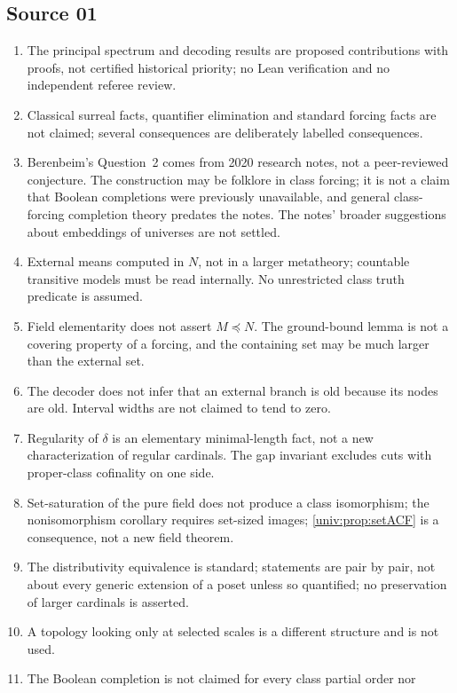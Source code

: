 \documentclass[11pt,letterpaper]{article}
\numberwithin{equation}{section}
\theoremstyle{definition}
\theoremstyle{remark}
\begin{document}
\subsection*{Source 01}
\begin{enumerate}[label=01.\arabic*,leftmargin=3.2em]
\item The principal spectrum and decoding results are proposed contributions
with proofs, not certified historical priority; no Lean verification and no
independent referee review.
\item Classical surreal facts, quantifier elimination and standard forcing facts
are not claimed; several consequences are deliberately labelled consequences.
\item Berenbeim's Question~2 comes from 2020 research notes, not a peer-reviewed
conjecture. The construction may be folklore in class forcing; it is not a
claim that Boolean completions were previously unavailable, and general
class-forcing completion theory predates the notes. The notes' broader
suggestions about embeddings of universes are not settled.
\item External means computed in $N$, not in a larger metatheory; countable
transitive models must be read internally. No unrestricted class truth
predicate is assumed.
\item Field elementarity does not assert $M\preccurlyeq N$. The ground-bound
lemma is not a covering property of a forcing, and the containing set may be
much larger than the external set.
\item The decoder does not infer that an external branch is old because its
nodes are old. Interval widths are not claimed to tend to zero.
\item Regularity of $\delta$ is an elementary minimal-length fact, not a new
characterization of regular cardinals. The gap invariant excludes cuts with
proper-class cofinality on one side.
\item Set-saturation of the pure field does not produce a class isomorphism;
the nonisomorphism corollary requires set-sized images;
\cref{univ:prop:setACF} is a consequence, not a new field theorem.
\item The distributivity equivalence is standard; statements are pair by pair,
not about every generic extension of a poset unless so quantified; no
preservation of larger cardinals is asserted.
\item A topology looking only at selected scales is a different structure and
is not used.
\item The Boolean completion is not claimed for every class partial order nor

\end{enumerate}
\end{document}

